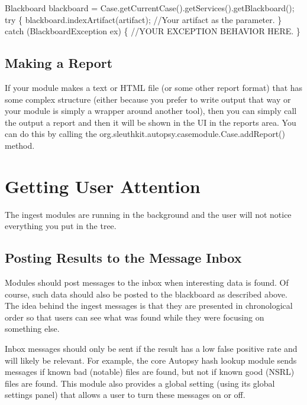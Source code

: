 \begin{DoxyCode}
Blackboard blackboard = Case.getCurrentCase().getServices().getBlackboard();
\textcolor{keywordflow}{try} \{
    blackboard.indexArtifact(artifact); \textcolor{comment}{//Your artifact as the parameter.}
\}
\textcolor{keywordflow}{catch} (BlackboardException ex) \{
    \textcolor{comment}{//YOUR EXCEPTION BEHAVIOR HERE.}
\}
\end{DoxyCode}
\hypertarget{mod_ingest_page_ingest_modules_making_results_report}{}\subsection{Making a Report}\label{mod_ingest_page_ingest_modules_making_results_report}
If your module makes a text or H\+T\+ML file (or some other report format) that has some complex structure (either because you prefer to write output that way or your module is simply a wrapper around another tool), then you can simply call the output a report and then it will be shown in the UI in the reports area. You can do this by calling the org.\+sleuthkit.\+autopsy.\+casemodule.\+Case.\+add\+Report() method.\hypertarget{mod_ingest_page_ingest_modules_users}{}\section{Getting User Attention}\label{mod_ingest_page_ingest_modules_users}
The ingest modules are running in the background and the user will not notice everything you put in the tree.\hypertarget{mod_ingest_page_ingest_modules_making_results_inbox}{}\subsection{Posting Results to the Message Inbox}\label{mod_ingest_page_ingest_modules_making_results_inbox}
Modules should post messages to the inbox when interesting data is found. Of course, such data should also be posted to the blackboard as described above. The idea behind the ingest messages is that they are presented in chronological order so that users can see what was found while they were focusing on something else.

Inbox messages should only be sent if the result has a low false positive rate and will likely be relevant. For example, the core Autopsy hash lookup module sends messages if known bad (notable) files are found, but not if known good (N\+S\+RL) files are found. This module also provides a global setting (using its global settings panel) that allows a user to turn these messages on or off.

